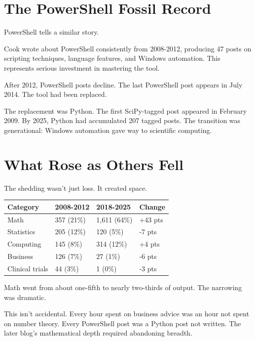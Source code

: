 \bigskip

\section*{The PowerShell Fossil Record}

PowerShell tells a similar story.

Cook wrote about PowerShell consistently from 2008-2012, producing 47 posts on scripting techniques, language features, and Windows automation. This represents serious investment in mastering the tool.

After 2012, PowerShell posts decline. The last PowerShell post appears in July 2014. The tool had been replaced.

The replacement was Python. The first SciPy-tagged post appeared in February 2009. By 2025, Python had accumulated 207 tagged posts. The transition was generational: Windows automation gave way to scientific computing.


\bigskip

\section*{What Rose as Others Fell}

The shedding wasn't just loss. It created space.

\begin{longtable}{p{2.25cm}p{2.25cm}p{2.25cm}p{2.25cm}}
\toprule
\textbf{Category} & \textbf{2008-2012} & \textbf{2018-2025} & \textbf{Change} \tabularnewline
\midrule
Math & 357 (21\%) & 1,611 (64\%) & +43 pts \tabularnewline
Statistics & 205 (12\%) & 120 (5\%) & -7 pts \tabularnewline
Computing & 145 (8\%) & 314 (12\%) & +4 pts \tabularnewline
Business & 126 (7\%) & 27 (1\%) & -6 pts \tabularnewline
Clinical trials & 44 (3\%) & 1 (0\%) & -3 pts \tabularnewline
\bottomrule
\end{longtable}

Math went from about one-fifth to nearly two-thirds of output. The narrowing was dramatic.

This isn't accidental. Every hour spent on business advice was an hour not spent on number theory. Every PowerShell post was a Python post not written. The later blog's mathematical depth required abandoning breadth.

\bigskip

